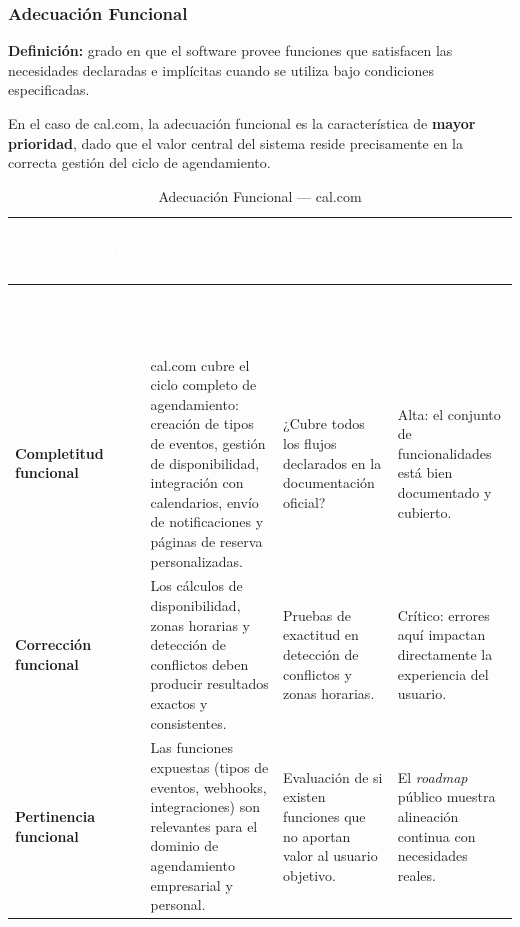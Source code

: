 \documentclass[12pt, a4paper]{article}
\newcommand{\rowpair}{\rowcolor{grisMedio}}
\newcommand{\rowimpar}{\rowcolor{grisClaro}}
\begin{document}
\subsubsection{Adecuación Funcional}

\textbf{Definición:} grado en que el software provee funciones que satisfacen las
necesidades declaradas e implícitas cuando se utiliza bajo condiciones especificadas.

En el caso de cal.com, la adecuación funcional es la característica de \textbf{mayor
prioridad}, dado que el valor central del sistema reside precisamente en la correcta
gestión del ciclo de agendamiento.

\begin{longtable}{>{\bfseries}p{3cm} p{4.5cm} p{4cm} p{3.5cm}}
\caption{Adecuación Funcional — cal.com} \label{tab:funcional} \\
\rowcolor{azulClaro}
\textcolor{white}{\textbf{Subcaracterística}} &
\textcolor{white}{\textbf{Descripción aplicada a cal.com}} &
\textcolor{white}{\textbf{Criterio de evaluación}} &
\textcolor{white}{\textbf{Observaciones}} \\
\endfirsthead
\multicolumn{4}{c}{\tablename\ \thetable{} -- continuación} \\
\rowcolor{azulClaro}
\textcolor{white}{\textbf{Subcaracterística}} &
\textcolor{white}{\textbf{Descripción aplicada a cal.com}} &
\textcolor{white}{\textbf{Criterio de evaluación}} &
\textcolor{white}{\textbf{Observaciones}} \\
\endhead
\rowpair
Completitud funcional &
cal.com cubre el ciclo completo de agendamiento: creación de tipos de eventos, gestión
de disponibilidad, integración con calendarios, envío de notificaciones y páginas de
reserva personalizadas. &
¿Cubre todos los flujos declarados en la documentación oficial? &
Alta: el conjunto de funcionalidades está bien documentado y cubierto. \\
\rowimpar
Corrección funcional &
Los cálculos de disponibilidad, zonas horarias y detección de conflictos deben producir
resultados exactos y consistentes. &
Pruebas de exactitud en detección de conflictos y zonas horarias. &
Crítico: errores aquí impactan directamente la experiencia del usuario. \\
\rowpair
Pertinencia funcional &
Las funciones expuestas (tipos de eventos, webhooks, integraciones) son relevantes para
el dominio de agendamiento empresarial y personal. &
Evaluación de si existen funciones que no aportan valor al usuario objetivo. &
El \textit{roadmap} público muestra alineación continua con necesidades reales. \\
\end{longtable}
\end{document}
